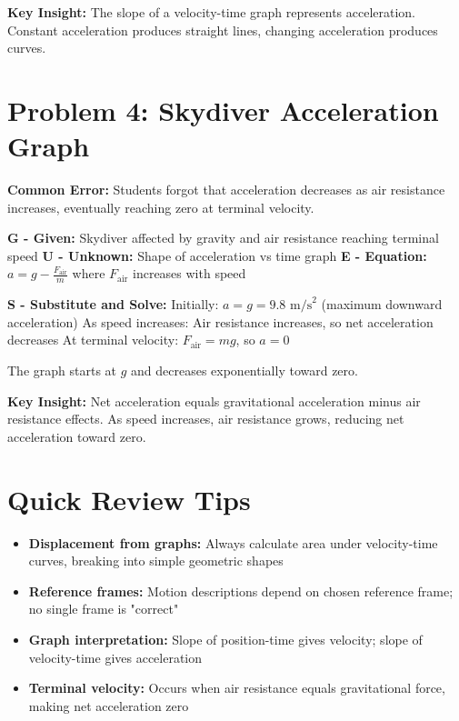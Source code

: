 \documentclass[12pt]{article}
\begin{document}
\textbf{Key Insight:} The slope of a velocity-time graph represents acceleration. Constant acceleration produces straight lines, changing acceleration produces curves.

\section{Problem 4: Skydiver Acceleration Graph}
\textbf{Common Error:} Students forgot that acceleration decreases as air resistance increases, eventually reaching zero at terminal velocity.

\textbf{G - Given:} Skydiver affected by gravity and air resistance reaching terminal speed
\textbf{U - Unknown:} Shape of acceleration vs time graph
\textbf{E - Equation:} $a = g - \frac{F_{\text{air}}}{m}$ where $F_{\text{air}}$ increases with speed

\textbf{S - Substitute and Solve:}
Initially: $a = g = 9.8 \text{ m/s}^2$ (maximum downward acceleration)
As speed increases: Air resistance increases, so net acceleration decreases
At terminal velocity: $F_{\text{air}} = mg$, so $a = 0$

The graph starts at $g$ and decreases exponentially toward zero.

\textbf{Key Insight:} Net acceleration equals gravitational acceleration minus air resistance effects. As speed increases, air resistance grows, reducing net acceleration toward zero.

\section{Quick Review Tips}
\begin{itemize}
\item \textbf{Displacement from graphs:} Always calculate area under velocity-time curves, breaking into simple geometric shapes
\item \textbf{Reference frames:} Motion descriptions depend on chosen reference frame; no single frame is "correct"
\item \textbf{Graph interpretation:} Slope of position-time gives velocity; slope of velocity-time gives acceleration
\item \textbf{Terminal velocity:} Occurs when air resistance equals gravitational force, making net acceleration zero
\end{itemize}
\end{document}
